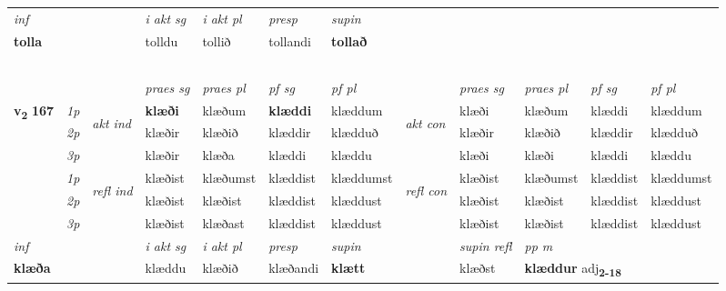 \begin{longtable}[l]{X>{\footnotesize\itshape}llXXXXlXXXX}
   {\textit{inf}} & &  & \textit{i akt sg} & \textit{i akt pl}   & \textit{presp} & \textit{supin}   \\*
  {\textbf{tolla}} & && tolldu  & tollið   & tollandi &  \textbf{tollað}   \\*

\midrule
  & \\*
  & \\*
  & \\*
   & \\*
  & \\
   \midrule
 & &   & \textit{praes sg}  & \textit{praes pl}    & \textit{ pf sg} & \textit{pf pl} & & \textit{praes sg}  & \textit{praes pl}    & \textit{pf sg} & \textit{pf pl }  \\ \cmidrule{4-7} \cmidrule{9-12}
 \multirow{2}{*}{{{\textbf{v{\textsubscript{2}}} \Large{\textbf{167}}}}}  & 1p & \multirow{3}{*}{\begin{turn}{90}\textit{akt ind}\end{turn}} & \textbf{klæði} & klæðum & \textbf{klæddi} & klæddum & \multirow{3}{*}{\begin{turn}{90}\textit{akt con}\end{turn}} &klæði & klæðum & klæddi & klæddum\\*
 & 2p &  &  klæðir  & klæðið & klæddir & klædduð & & klæðir & klæðið & klæddir & klædduð \\*
 & 3p &  & klæðir & klæða & klæddi & klæddu & & klæði & klæði& klæddi & klæddu \\*
\cmidrule{4-7} \cmidrule{9-12}
 & 1p & \multirow{3}{*}{\begin{turn}{90}\textit{refl ind}\end{turn}}  & klæðist & klæðumst & klæddist & klæddumst & \multirow{3}{*}{\begin{turn}{90}\textit{refl con}\end{turn}}  &klæðist & klæðumst & klæddist & klæddumst \\*
 & 2p &  & klæðist & klæðist & klæddist & klæddust & &klæðist & klæðist & klæddist & klæddust \\*
 & 3p  & & klæðist & klæðast & klæddist & klæddust & & klæðist & klæðist& klæddist & klæddust \\*
\cmidrule{4-7} \cmidrule{9-12}

   {\textit{inf}} & &  & \textit{i akt sg} & \textit{i akt pl}   & \textit{presp} & \textit{supin} && \textit{supin refl} & \textit{pp m} \\*
  {\textbf{klæða}} & && klæddu  & klæðið   & klæðandi &  \textbf{klætt} && klæðst & \multicolumn{2}{l}{\textbf{klæddur} adj\textbf{\textsubscript{2-18}}} \\*


\end{longtable}
